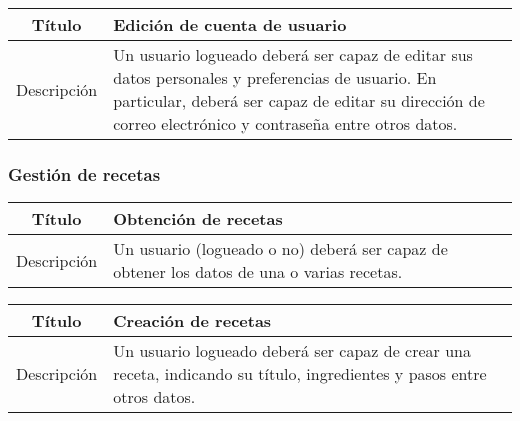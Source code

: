 \begin{center}
  
  \begin{tabularx}{\textwidth}{|c|X|}
    \hline
    Título & Edición de cuenta de usuario \\

    \hline

    Descripción & Un usuario logueado deberá ser capaz de editar sus datos
    personales y preferencias de usuario. En particular, deberá ser capaz de
    editar su dirección de correo electrónico y contraseña entre otros datos.\\

    \hline
  \end{tabularx}
\end{center}



\subsubsection{Gestión de recetas}

\begin{center}
  
  \begin{tabularx}{\textwidth}{|c|X|}
    \hline
    Título & Obtención de recetas \\

    \hline

    Descripción & Un usuario (logueado o no) deberá ser capaz de obtener los
    datos de una o varias recetas.\\

    \hline
  \end{tabularx}
\end{center}

\begin{center}
  
  \begin{tabularx}{\textwidth}{|c|X|}
    \hline
    Título & Creación de recetas \\

    \hline

    Descripción & Un usuario logueado deberá ser capaz de crear una receta,
    indicando su título, ingredientes y pasos entre otros datos.\\

    \hline
  \end{tabularx}
\end{center}


